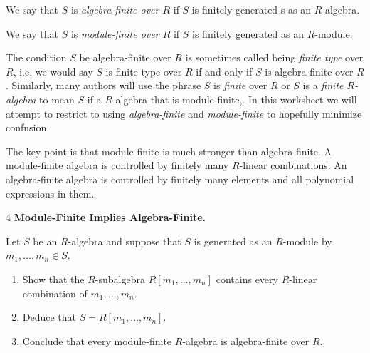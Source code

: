 \documentclass[Notebook.tex]{subfiles}
\begin{document}
\begin{definition}
   We say that $S$ is \emph{algebra-finite over $R$} if $S$ is finitely generated s as an $R$-algebra.
\end{definition}

\begin{definition}
	We say that $S$ is \emph{module-finite over $R$} if $S$ is finitely generated as an $R$-module.
\end{definition}

The condition $S$ be algebra-finite over $R$ is sometimes called being \emph{finite type} over $R$, i.e. we would say $S$ is finite type over $R$ if and only if $S$ is algebra-finite over $R$. Similarly, many authors will use the phrase $S$ is \emph{finite} over $R$ or $S$ is a \emph{finite $R$-algebra} to mean $S$ if a $R$-algebra that is module-finite,. In this worksheet we will attempt to restrict to using \emph{algebra-finite} and \emph{module-finite} to hopefully minimize confusion.

The key point is that module-finite is much stronger than algebra-finite. A module-finite algebra is controlled by finitely many $R$-linear combinations. An algebra-finite algebra is controlled by finitely many elements and all polynomial expressions in them.

\hrulefill

\newpage 

\begin{problem}{4}
    \textbf{Module-Finite Implies Algebra-Finite.} 
    
    Let $S$ be an $R$-algebra and suppose that $S$ is generated as an $R$-module by $m_1,\ldots,m_n\in S$.
    \begin{enumerate}
        \item Show that the $R$-subalgebra $R[m_1,\ldots,m_n]$ contains every $R$-linear combination of $m_1,\ldots,m_n$.
        \item Deduce that $S=R[m_1,\ldots,m_n]$.
        \item Conclude that every module-finite $R$-algebra is algebra-finite over $R$.
    \end{enumerate}
\end{problem}
\end{document}

